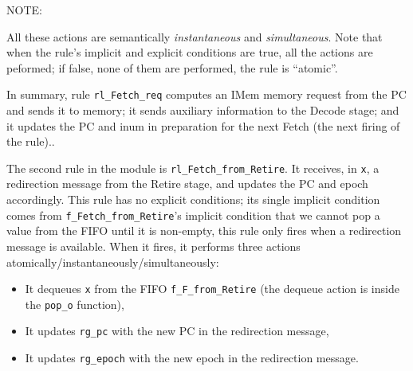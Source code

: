 \vspace{1ex}

NOTE: 

\vspace{1ex}


All these actions are semantically \emph{instantaneous} and
\emph{simultaneous}.  Note that when the rule's implicit and explicit
conditions are true, all the actions are peformed; if false, none of
them are performed, {\ie} the rule is ``atomic''.

In summary, rule \verb|rl_Fetch_req| computes an IMem memory request
from the PC and sends it to memory; it sends auxiliary information to
the Decode stage; and it updates the PC and inum in preparation for
the next Fetch (the next firing of the rule)..

The second rule in the module is \verb|rl_Fetch_from_Retire|. It
receives, in \verb|x|, a redirection message from the Retire stage,
and updates the PC and epoch accordingly.  This rule has no explicit
conditions; its single implicit condition comes from
\verb|f_Fetch_from_Retire|'s implicit condition that we cannot pop a
value from the FIFO until it is non-empty, {\ie} this rule only fires
when a redirection message is available.  When it fires, it performs
three actions atomically/instantaneously/simultaneously:
 
\begin{itemize}

 \item It dequeues \verb|x| from the FIFO \verb|f_F_from_Retire| (the
       dequeue action is inside the \verb|pop_o| function),
 \item It updates \verb|rg_pc| with the new PC in the redirection message,
 \item It updates \verb|rg_epoch| with the new epoch in the redirection message.

\end{itemize}

